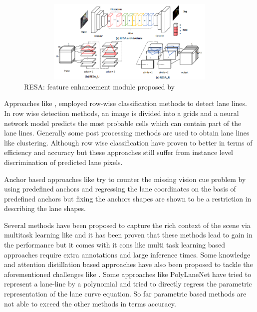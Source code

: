     \begin{figure}[h]
    \centering
\includegraphics[width=12cm, height=4cm]{images/resa_module.png}
    \caption{RESA: feature enhancement module proposed by \cite{DBLP:journals/corr/abs-2008-13719}}
    \end{figure}

 Approaches like \cite{DBLP:journals/corr/abs-2005-08630}, \cite{DBLP:journals/corr/abs-2004-11757} employed row-wise classification methods to detect lane lines. In row wise detection methods, an image is divided into a grids and a neural network model predicts the most probable cells which can contain part of the lane lines. Generally some post processing methods are used to obtain lane lines like clustering. Although row wise classification have proven to better in terms of efficiency and accuracy but these approaches still suffer from instance level discrimination of predicted lane pixels.
 
 Anchor based approaches like  \cite{https://doi.org/10.48550/arxiv.2010.12035} try to counter the missing vision cue problem by using predefined anchors and regressing the lane coordinates on the basis of predefined anchors but fixing the anchors shapes are shown to be a restriction in describing the lane shapes.

Several methods have been proposed to capture the rich context of the scene via multitask learning like \cite{inbook} and it has been proven that these methods lead to gain in the performance but it comes with it cons like multi task learning based approaches require extra annotations and large inference times. Some knowledge and attention distillation based approaches have also been proposed to tackle the aforementioned challenges like \cite{DBLP:journals/corr/abs-1908-00821}. Some approaches like PolyLaneNet\cite{DBLP:journals/corr/abs-2004-10924} have tried  to represent a lane-line by a polynomial and tried to directly regress the parametric representation of the lane curve equation. So far parametric based methods are not able to exceed the other methods in terms accuracy.

